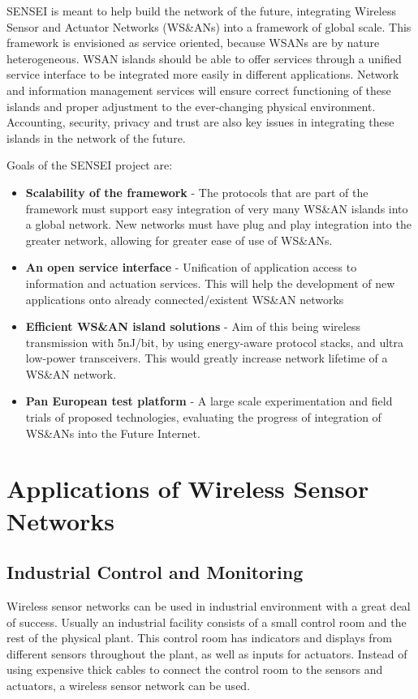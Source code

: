 SENSEI is meant to help build the network of the future, integrating Wireless Sensor and Actuator Networks (WS\&ANs) into a framework of global scale. This 
framework is envisioned as service oriented, because WSANs are by nature heterogeneous. WSAN islands should be able to offer services through a unified service
interface to be integrated more easily in different applications. Network and information management services will ensure correct functioning of these islands
and proper adjustment to the ever-changing physical environment. Accounting, security, privacy and trust are also key issues in integrating these islands in the
network of the future.


Goals of the SENSEI project are:
\begin{itemize}
\item \textbf{Scalability of the framework} - The protocols that are part of the framework must support easy integration of very many WS\&AN islands 
into a global network. New networks must have plug and play integration into the greater network, allowing for greater ease of use of WS\&ANs. 
\item \textbf{An open service interface} - Unification of application access to information and actuation services. This will help the development of new
applications onto already connected/existent WS\&AN networks
\item \textbf{Efficient WS\&AN island solutions} - Aim of this being wireless transmission with 5nJ/bit, by using energy-aware protocol stacks, and ultra low-power
transceivers. This would greatly increase network lifetime of a WS\&AN network.
\item \textbf{Pan European test platform} - A large scale experimentation and field trials of proposed technologies, evaluating the progress of integration
of WS\&ANs into the Future Internet.
\end{itemize}


\section{Applications of Wireless Sensor Networks}
\subsection{Industrial Control and Monitoring}

Wireless sensor networks can be used in industrial environment with a great deal of success. Usually an industrial
facility consists of a small control room and the rest of the physical plant. This control room has indicators and displays
from different sensors throughout the plant, as well as inputs for actuators. Instead of using expensive thick cables to
connect the control room to the sensors and actuators, a wireless sensor network can be used.

